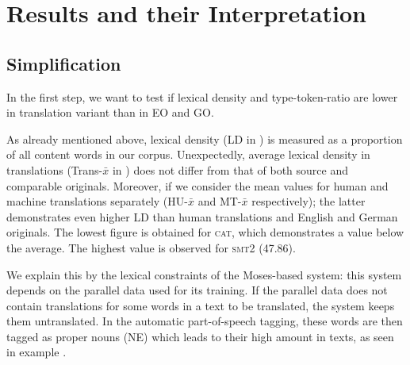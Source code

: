 \documentclass[output=paper]{LSP/langsci}
\begin{document}
\section{Results and their Interpretation} \label{sec:4:4} 
\subsection{Simplification}
In the first step, we want to test if lexical density and type-token-ratio are lower in translation variant than in EO and GO.


     \begin{table}
     \centering
 \caption{\textsc{sttr} and LD in \textsc{vartra}-\textsc{small}}
     \label{tab:4.2}
\end{table}


As already mentioned above, lexical density (LD in ) is measured as a proportion of all content words in our corpus. Unexpectedly, average lexical density in translations (Trans-$\bar{x}$ in ) does not differ from that of both source and comparable originals. Moreover, if we consider the mean values for human and machine translations separately (HU-$\bar{x}$ and MT-$\bar{x}$ respectively); the latter demonstrates even higher LD than human translations and English and German originals. The lowest figure is obtained for \textsc{cat}, which demonstrates a value below the average. The highest value is observed for \textsc{smt}2 (47.86).

We explain this by the lexical constraints of the Moses-based system: this system depends on the parallel data used for its training.  If the parallel data does not contain translations for some words in a text to be translated, the system keeps them untranslated. In the automatic part-of-speech tagging, these words are then tagged as proper nouns (NE) which leads to their high amount in texts, as seen in example .
\end{document}

